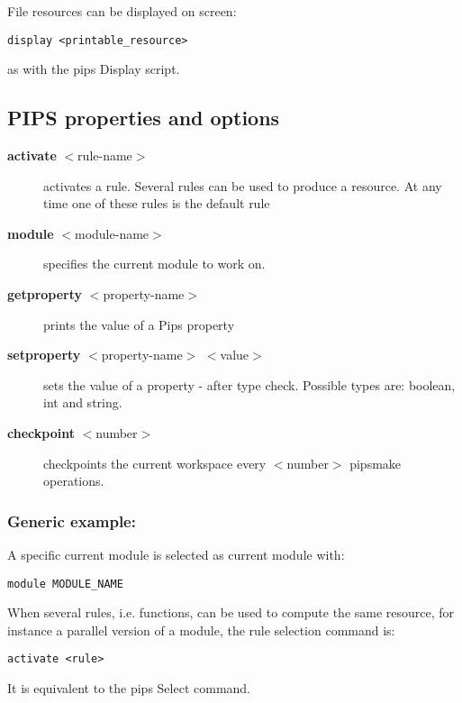 \documentclass[a4paper,12pt]{article}
\begin{document}
File resources can be displayed on screen:

{\bf
\begin{verbatim}
display <printable_resource> 
\end{verbatim}
}
as with the pips Display script.

\subsection{PIPS properties and options} 

\begin{description}
\item [ {\bf activate} $<$rule-name$>$] activates a rule. Several rules
  can be used to produce a resource. At any time one of these rules is the
  default rule
 
\item [ {\bf module} $<$module-name$>$] specifies the current module to
  work on.
  
\item [ {\bf getproperty} $<$property-name$>$] prints the value of a Pips
  property
  
\item [ {\bf setproperty} $<$property-name$>$ $<$value$>$] sets the value
  of a property - after type check. Possible types are: boolean, int and
  string.

\item [{\bf checkpoint} $<$number$>$] checkpoints the current workspace
  every $<$number$>$ pipsmake operations.

\end{description}
 
\subsubsection*{Generic example:}

A specific current module is selected as current module with:
{\bf
\begin{verbatim}
module MODULE_NAME
\end{verbatim}
}

When several rules, i.e. functions, can be used to compute
the same resource, for instance a parallel version of a
module, the rule selection command is:

{\bf
\begin{verbatim}
activate <rule>
\end{verbatim}
}

It is equivalent to the pips Select command.
\end{document}
